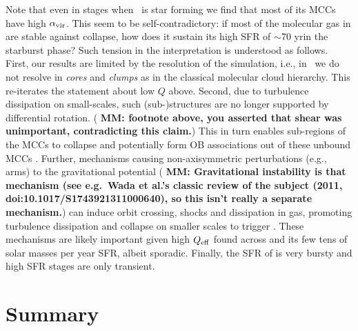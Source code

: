 \IfFileExists{emulateapjlegacy.cls}{\documentclass[iop]{emulateapjlegacy}}{\documentclass[iop]{emulateapj}}
\newcommand{\MM}[1]{({\bf \color{mmcolor} MM: #1})}
\begin{document}
Note that even in stages when \flower~is star forming we find that most of its MCCs have high $\alpha_{\rm vir}$. This seem to be self-contradictory: if most of the molecular gas in \flower are stable against collapse, how does it sustain its high SFR of $\sim$70\,\Msun\,yr\pmOne in the starburst phase? Such tension in the interpretation is understood as follows.
%
First, our results are limited by the resolution of the simulation, i.e., in \flower~we do not resolve \SF in {\it cores} and {\it clumps} as in the classical molecular cloud hierarchy. This re-iterates the statement about low $Q$ above.
%
Second, due to turbulence dissipation on small-scales, such
(sub-)structures are no longer supported by differential rotation.  \MM{footnote above, you asserted that shear was
  unimportant, contradicting this claim.} This in turn enables sub-regions of the MCCs to collapse and potentially form OB associations out of these unbound MCCs \citep{Clark04a, Clark05a}.
%
Further, mechanisms causing non-axisymmetric perturbations (e.g.,
arms) to the gravitational potential \MM{Gravitational instability is
  that mechanism (see e.g.\ Wada et al.'s classic review of the
  subject (2011, doi:10.1017/S1743921311000640), so this isn't really a separate mechanism.} can induce orbit crossing, shocks and dissipation in gas, promoting turbulence dissipation and collapse on smaller scales to trigger \SF. These mechanisms are likely important given high $Q_{\rm eff}$ found across \flower and its few tens of solar masses per year SFR, albeit sporadic.
Finally, the SFR of \flower is very bursty and high SFR stages are only transient.

\section{Summary}      \label{sec:conclusion}
\end{document}
